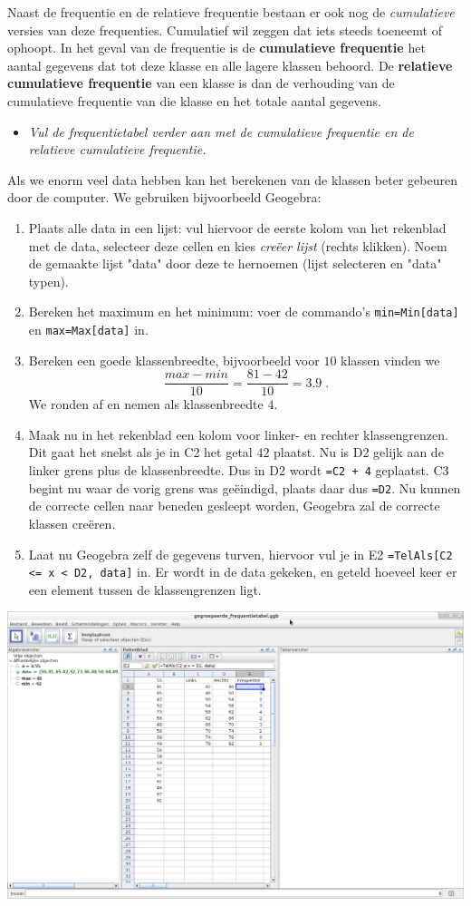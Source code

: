 \documentclass[11pt]{article}
\newcommand{\vraag}[2]{\begin{itemize}\item {\it #1} \vspace*{#2}\end{itemize}}
\begin{document}
Naast de frequentie en de relatieve frequentie bestaan er ook nog de {\it cumulatieve} versies van deze frequenties. Cumulatief wil zeggen dat iets steeds toeneemt of ophoopt. In het geval van de frequentie is de {\bf cumulatieve frequentie} het aantal gegevens dat tot deze klasse en alle lagere klassen behoord. De {\bf relatieve cumulatieve frequentie} van een klasse is dan de verhouding van de cumulatieve frequentie van die klasse en het totale aantal gegevens.

\vraag{Vul de frequentietabel verder aan met de cumulatieve frequentie en de relatieve cumulatieve frequentie.}{0cm}

Als we enorm veel data hebben kan het berekenen van de klassen beter gebeuren door de computer. We gebruiken
bijvoorbeeld Geogebra:
\begin{enumerate}
  \item Plaats alle data in een lijst: vul hiervoor de eerste kolom van het rekenblad met de data, selecteer deze cellen en kies {\it creëer lijst} (rechts klikken). Noem de gemaakte lijst "data" door deze te hernoemen (lijst selecteren en "data" typen).
  \item Bereken het maximum en het minimum: voer de commando's \verb#min=Min[data]# en \verb#max=Max[data]# in.
  \item Bereken een goede klassenbreedte, bijvoorbeeld voor $10$ klassen vinden we $$\frac{max-min}{10}=\frac{81-42}{10}=3.9\;.$$ We ronden af en nemen als klassenbreedte $4$.
  \item Maak nu in het rekenblad een kolom voor linker- en rechter klassengrenzen. Dit gaat het snelst als je in C2 het getal $42$ plaatst. Nu is D2 gelijk aan de linker grens plus de klassenbreedte. Dus in D2 wordt \verb#=C2 + 4# geplaatst. C3 begint nu waar de vorig grens was geëindigd, plaats daar dus \verb#=D2#. Nu kunnen de correcte cellen naar beneden gesleept worden, Geogebra zal de correcte klassen creëren.
  \item Laat nu Geogebra zelf de gegevens turven, hiervoor vul je in E2 \verb#=TelAls[C2 <= x < D2, data]# in. Er wordt in de data gekeken, en geteld hoeveel keer er een element tussen de klassengrenzen ligt.
\end{enumerate}

\begin{center}
  \includegraphics[width=14cm]{gg-gegroepeerde_frequentietabel}
\end{center}
\end{document}
